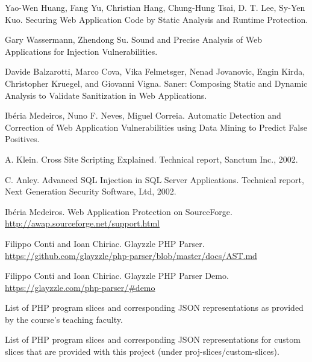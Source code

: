 \documentclass[10pt,onecolumn,a4paper]{article}
\begin{document}
\pagebreak

\begin{thebibliography}{5}

	Yao-Wen Huang, Fang Yu, Christian Hang, Chung-Hung Tsai, D. T. Lee, Sy-Yen Kuo. 
	Securing Web Application Code by Static Analysis and Runtime Protection.
	
	Gary Wassermann, Zhendong Su. Sound and Precise Analysis of Web Applications
for Injection Vulnerabilities.
	
	Davide Balzarotti, Marco Cova, Vika Felmetsger, Nenad Jovanovic, Engin Kirda, Christopher Kruegel, and Giovanni Vigna. Saner: Composing Static and Dynamic Analysis to
Validate Sanitization in Web Applications.
	
	Ibéria Medeiros, Nuno F. Neves, Miguel Correia. Automatic Detection and Correction of Web Application
Vulnerabilities using Data Mining to Predict False Positives.
	

	A. Klein. Cross Site Scripting Explained. Technical report,
Sanctum Inc., 2002.

	C. Anley. Advanced SQL Injection in SQL Server Applications.
Technical report, Next Generation Security Software,
Ltd, 2002.

	 Ibéria Medeiros. Web Application Protection on SourceForge.
	\url{http://awap.sourceforge.net/support.html}
	
	 Filippo Conti and Ioan Chiriac. Glayzzle PHP Parser.
	\url{https://github.com/glayzzle/php-parser/blob/master/docs/AST.md}
	
	 Filippo Conti and Ioan Chiriac. Glayzzle PHP Parser Demo.
	\url{https://glayzzle.com/php-parser/#demo}
	
	 List of PHP program slices and corresponding JSON representations as provided by the course's teaching faculty.
	
	 List of PHP program slices and corresponding JSON representations for custom slices that are provided with this project (under proj-slices/custom-slices).
	


\end{thebibliography}

\end{document}
